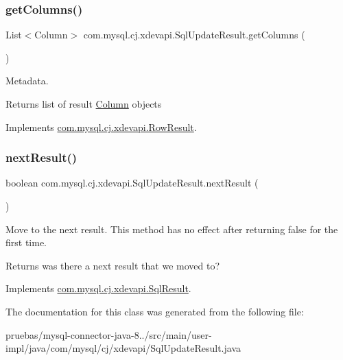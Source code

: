 \subsubsection{\texorpdfstring{get\+Columns()}{getColumns()}}
{\footnotesize\ttfamily List$<$Column$>$ com.\+mysql.\+cj.\+xdevapi.\+Sql\+Update\+Result.\+get\+Columns (\begin{DoxyParamCaption}{ }\end{DoxyParamCaption})}

Metadata.

\begin{DoxyReturn}{Returns}
list of result \mbox{\hyperlink{interfacecom_1_1mysql_1_1cj_1_1xdevapi_1_1_column}{Column}} objects 
\end{DoxyReturn}


Implements \mbox{\hyperlink{interfacecom_1_1mysql_1_1cj_1_1xdevapi_1_1_row_result_a4bd495dadd5549516c0f32366f8d77c7}{com.\+mysql.\+cj.\+xdevapi.\+Row\+Result}}.

\mbox{\label{classcom_1_1mysql_1_1cj_1_1xdevapi_1_1_sql_update_result_a3fad012f9b23f87f7aac62edd51c604a}} 
\subsubsection{\texorpdfstring{next\+Result()}{nextResult()}}
{\footnotesize\ttfamily boolean com.\+mysql.\+cj.\+xdevapi.\+Sql\+Update\+Result.\+next\+Result (\begin{DoxyParamCaption}{ }\end{DoxyParamCaption})}

Move to the next result. This method has no effect after returning {\ttfamily false} for the first time.

\begin{DoxyReturn}{Returns}
was there a next result that we moved to? 
\end{DoxyReturn}


Implements \mbox{\hyperlink{interfacecom_1_1mysql_1_1cj_1_1xdevapi_1_1_sql_result_ad5c821bd2efe2e952aef48dc574e913d}{com.\+mysql.\+cj.\+xdevapi.\+Sql\+Result}}.



The documentation for this class was generated from the following file\+:\begin{DoxyCompactItemize}
\item 
pruebas/mysql-\/connector-\/java-\/8../src/main/user-\/impl/java/com/mysql/cj/xdevapi/Sql\+Update\+Result.\+java\end{DoxyCompactItemize}
